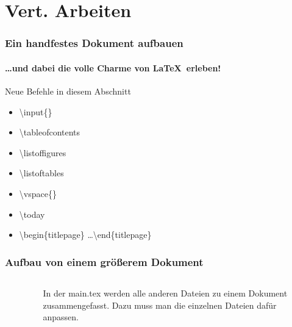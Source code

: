 \section{Vert. Arbeiten}
\begin{frame}
\frametitle{Ein handfestes Dokument aufbauen}
\framesubtitle{\ldots und dabei die volle Charme von \LaTeX ~erleben!}
\begin{block}{Neue Befehle in diesem Abschnitt}
\begin{itemize}
  \item \color{nounibaredI}\textbackslash input\color{black}\{\}
  \item \color{nounibaredI}\textbackslash tableofcontents\color{black}
  \item \color{nounibaredI}\textbackslash listoffigures\color{black}
  \item \color{nounibaredI}\textbackslash listoftables\color{black}
  \item \color{nounibaredI}\textbackslash vspace\color{black}\{\}
  \item \color{nounibaredI}\textbackslash today\color{black}
\item \color{unibablueI}\textbackslash begin\color{black}\{titlepage\} \ldots \color{unibablueI}\textbackslash end\color{black}\{titlepage\} 
\end{itemize}
\end{block}
\end{frame}

\begin{frame}
\frametitle{Aufbau von einem gr\"o\ss erem Dokument}

\begin{columns}
\begin{column}{.5\textwidth}
\footnotesize
\begin{figure}[t]
\end{figure}
\end{column}
\begin{column}{.5\textwidth}
In der main.tex werden alle anderen Dateien zu einem Dokument zusammengefasst. 
Dazu muss man die einzelnen Dateien daf\"ur anpassen.
\end{column}
\end{columns}
\end{frame}

